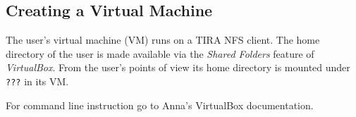 \documentclass[12pt,a4paper,oneside,titlepage,draft]{report}
\newcommand{\tira}{TIRA\xspace}
\newenvironment{note}
  {\small\begin{mdframed}[backgroundcolor=yellow,linewidth=0,skipabove=3,skipbelow=4]}
  {\end{mdframed}}
\begin{document}
\subsection{Creating a Virtual Machine}
The user's virtual machine (VM) runs on a \tira NFS client. The home directory of the user is made available via the \emph{Shared Folders} feature of \emph{VirtualBox}. From the user's points of view its home directory is mounted under \texttt{???} in its VM.

\begin{note}
For command line instruction go to Anna's VirtualBox documentation.
\end{note}
\end{document}

